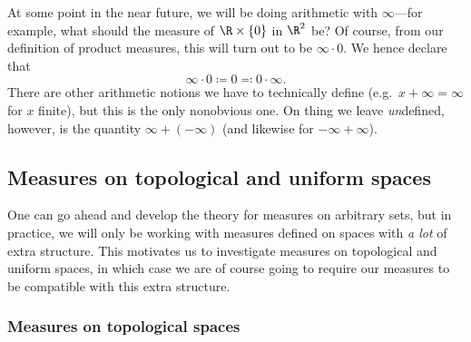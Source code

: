 \begin{important}
At some point in the near future, we will be doing arithmetic with $\infty$---for example, what should the measure of $\R \times \{ 0\}$ in $\R ^2$ be?  Of course, from our definition of product measures, this will turn out to be $\infty \cdot 0$.  We hence declare that
\begin{equation}
\infty \cdot 0\coloneqq 0\eqqcolon 0\cdot \infty .
\end{equation}
There are other arithmetic notions we have to technically define (e.g.~$x+\infty=\infty$ for $x$ finite), but this is the only 						nonobvious one.  On thing we leave \emph{un}defined, however, is the quantity $\infty +(-\infty )$ (and likewise for $-\infty +\infty$).
\end{important}

\subsection{Measures on topological and uniform spaces}

One can go ahead and develop the theory for measures on arbitrary sets, but in practice, we will only be working with measures defined on spaces with \emph{a lot} of extra structure.  This motivates us to investigate measures on topological and uniform spaces, in which case we are of course going to require our measures to be compatible with this extra structure.

\subsubsection{Measures on topological spaces}

